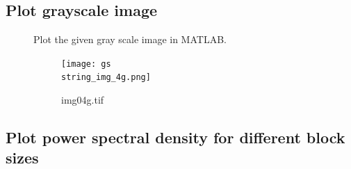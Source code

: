 \documentclass{article}
\begin{document}
\subsection{Plot grayscale image}
	\begin{description}
	\item[]
	Plot the given gray scale image in MATLAB.
		\begin{figure}[h]
			\begin{center}
				\texttt{[image: gs\\string\_img\_4g.png]}
				\caption{img04g.tif}
			\end{center}
		\end{figure}
	\end{description}

\subsection{Plot power spectral density for different block sizes}
\end{document}
